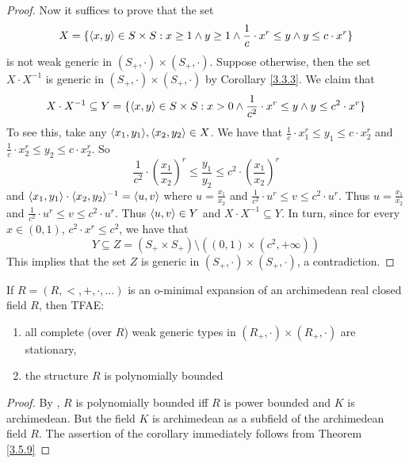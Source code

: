 \documentclass[11pt]{article}
\begin{document}
\begin{proof}
Now it suffices to prove that the set
\begin{equation*}
X=\{\langle x,y\rangle\in S\times S:x\ge 1\wedge y\ge 1\wedge\frac{1}{c}\cdot x^r\le y\wedge y\le c\cdot x^r\}
\end{equation*}
is not weak generic in \((S_+,\cdot)\times(S_+,\cdot)\). Suppose otherwise, then the set \(X\cdot X^{-1}\) is
generic in \((S_+,\cdot)\times(S_+,\cdot)\) by Corollary \ref{3.3.3}. We claim that
\begin{equation*}
X\cdot X^{-1}\subseteq Y=\{\langle x,y\rangle\in S\times S:x>0\wedge\frac{1}{c^2}\cdot x^r\le y\wedge y\le c^2\cdot x^r\}
\end{equation*}
To see this, take any \(\langle x_1,y_1\rangle,\langle x_2,y_2\rangle\in X\). We have that \(\frac{1}{c}\cdot x_1^r\le y_1\le c\cdot x_2^r\)
and \(\frac{1}{c}\cdot x_2^r\le y_2\le c\cdot x_2^r\). So
\begin{equation*}
\frac{1}{c^2}\cdot\left(\frac{x_1}{x_2}\right)^r\le\frac{y_1}{y_2}\le c^2\cdot\left( \frac{x_1}{x_2} \right)^r
\end{equation*}
and \(\langle x_1,y_1\rangle\cdot\langle x_2,y_2\rangle^{-1}=\langle u,v\rangle\) where \(u=\frac{x_1}{x_2}\)
and \(\frac{1}{c^2}\cdot u^r\le v\le c^2\cdot u^r\). Thus \(u=\frac{x_1}{x_2}\)
and \(\frac{1}{c^2}\cdot u^r\le v\le c^2\cdot u^r\). Thus \(\langle u,v\rangle\in Y\) and \(X\cdot X^{-1}\subseteq Y\). In turn, since for
every \(x\in(0,1)\), \(c^2\cdot x^r\le c^2\), we have that
\begin{equation*}
Y\subseteq Z=(S_+\times S_+)\setminus((0,1)\times (c^2,+\infty))
\end{equation*}
This implies that the set \(Z\) is generic in \((S_+,\cdot)\times(S_+,\cdot)\), a contradiction.
\end{proof}

\begin{corollary}[]
If \(R=(R,<,+,\cdot,\dots)\) is an o-minimal expansion of an archimedean real closed field \(R\), then
TFAE:
\begin{enumerate}
\item all complete (over \(R\)) weak generic types in \((R_+,\cdot)\times(R_+,\cdot)\) are stationary,
\item the structure \(R\) is polynomially bounded
\end{enumerate}
\end{corollary}

\begin{proof}
By \cite{miller1996growth}, \(R\) is polynomially bounded iff \(R\) is power bounded and \(K\) is
archimedean. But the field \(K\) is archimedean as a subfield of the archimedean field \(R\).
The assertion of the corollary immediately follows from Theorem \ref{3.5.9}
\end{proof}
\end{document}
